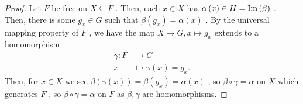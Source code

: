 \begin{proof}
	Let \(F\)  be free on \( X \subseteq F\) . Then, each \(x \in X\)  has \(\alpha\left( x \right) \in H = \operatorname{Im}\left( \beta \right) \) . Then, there is some \(g_{x} \in G\)  such that \(\beta\left( g_{x} \right) = \alpha\left( x \right)  \) . By the universal mapping property of \(F\) , we have the map \(X \to G, x \mapsto g_{x}\) extends to a homomorphism \begin{align*}
		\gamma: F &\longrightarrow G \\
		x &\longmapsto \gamma(x) = g_{x}
	.\end{align*}
	Then, for \(x \in X\) we see \(\beta\left( \gamma\left( x \right)  \right)  = \beta\left( g_{x} \right) = \alpha\left( x \right)  \)  , so \(\beta \circ \gamma = \alpha\)  on \(X\)  which generates \(F\) , so \(\beta \circ \gamma = \alpha\)  on \(F\)  as \(\beta, \gamma\)  are homomorphisms.
\end{proof}
